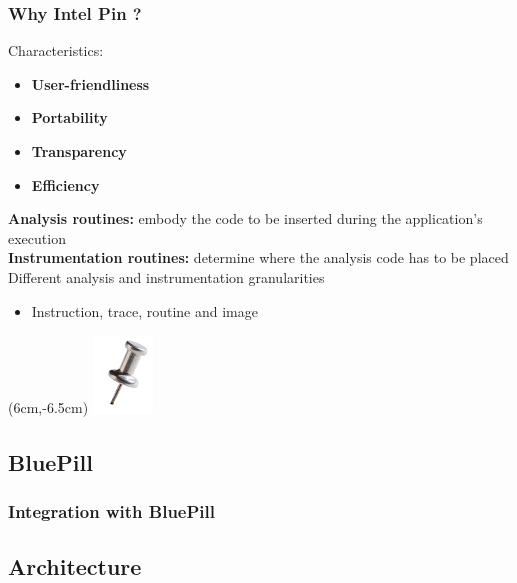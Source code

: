 \documentclass[compress]{beamer}
\begin{document}
\begin{frame}
    \frametitle{Why Intel Pin ?}
    
	Characteristics:
	\begin{itemize}
	\item \textbf{User-friendliness}
	\item \textbf{Portability}
	\item \textbf{Transparency}
	\item \textbf{Efficiency}
	\end{itemize}
	\bigskip
	\textbf{Analysis routines:} embody the code to be inserted during the application's execution\\
	\smallskip
	\textbf{Instrumentation routines:} determine where the analysis code has to be placed\\
	\bigskip
	Different analysis and instrumentation granularities
	\begin{itemize}
	\item Instruction, trace, routine and image
	\end{itemize}
    
    \begin{textblock*}{3cm}(6cm,-6.5cm)
   \includegraphics[width=1.6cm]{image/pin.png}%
	\end{textblock*}
	
	

\end{frame}

\subsection{BluePill}

\begin{frame}
    \frametitle{Integration with BluePill}
	

\end{frame}

\subsection{Architecture}
\end{document}
